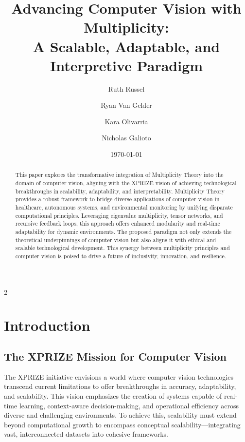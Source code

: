 \documentclass{article}
\theoremstyle{plain}
\begin{document}
\title{Advancing Computer Vision with Multiplicity: \\ A Scalable, Adaptable, and Interpretive Paradigm}


\author{Ruth Russel} 
\author{Ryan Van Gelder}
\author{Kara Olivarria}
\author{Nicholas Galioto}
\date{\today}

\maketitle

\begin{abstract}
This paper explores the transformative integration of Multiplicity Theory into the domain of computer vision, aligning with the XPRIZE vision of achieving technological breakthroughs in scalability, adaptability, and interpretability. Multiplicity Theory provides a robust framework to bridge diverse applications of computer vision in healthcare, autonomous systems, and environmental monitoring by unifying disparate computational principles. Leveraging eigenvalue multiplicity, tensor networks, and recursive feedback loops, this approach offers enhanced modularity and real-time adaptability for dynamic environments. The proposed paradigm not only extends the theoretical underpinnings of computer vision but also aligns it with ethical and scalable technological development. This synergy between multiplicity principles and computer vision is poised to drive a future of inclusivity, innovation, and resilience.
\end{abstract}
\newpage
\begin{multicols}{2}
\begin{singlespace}
\tableofcontents
\end{singlespace}
\end{multicols}
\newpage
\section{Introduction}
\subsection{The XPRIZE Mission for Computer Vision}
The XPRIZE initiative envisions a world where computer vision technologies transcend current limitations to offer breakthroughs in accuracy, adaptability, and scalability. This vision emphasizes the creation of systems capable of real-time learning, context-aware decision-making, and operational efficiency across diverse and challenging environments. To achieve this, scalability must extend beyond computational growth to encompass conceptual scalability—integrating vast, interconnected datasets into cohesive frameworks.
\end{document}
